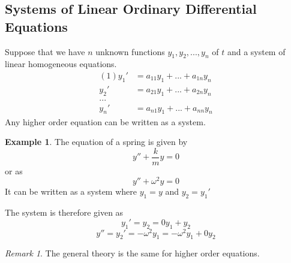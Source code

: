\documentclass[11pt]{article}
\theoremstyle{plain} %
\theoremstyle{definition}
\theoremstyle{example}
\newtheorem*{example}{Example}
\theoremstyle{remark}
\newtheorem*{remark}{Remark}
\begin{document}
\subsection{Systems of Linear Ordinary Differential Equations}
Suppose that we have $n$ unknown functions $y_1, y_2, ..., y_n$ of $t$ and a system of linear homogeneous equations. 
\begin{align*}(1)
y_1' &= a_{11}y_1 + ... + a_{1n}y_n \\
y_2' &= a_{21}y_1 + ... + a_{2n}y_n \\
...\\
y_n' &= a_{n1}y_1 + ... + a_{nn}y_n
\end{align*}
Any higher order equation can be written as a system. 

\begin{example}
The equation of a spring is given by $$y'' + \frac{k}{m}y = 0$$ or as $$y'' + \omega^2y = 0$$ It can be written as a system where $y_1 = y$ and $y_2 = y_1'$
\end{example}
The system is therefore given as 
$$y_1' = y_2 = 0y_1 + y_2 $$
$$y'' = y_2' = -\omega^2y_1 = -\omega^2y_1 + 0y_2$$

\begin{remark}
The general theory is the same for higher order equations.
\end{remark}
\end{document}
